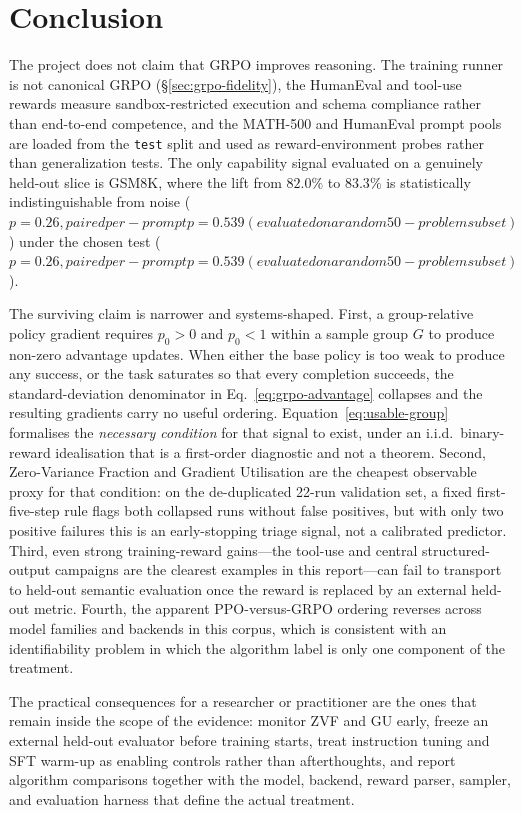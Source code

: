 \documentclass[12pt,a4paper]{report}
\begin{document}
\section{Conclusion}
The project does not claim that GRPO improves reasoning. The training runner is not canonical GRPO (§\ref{sec:grpo-fidelity}), the HumanEval and tool-use rewards measure sandbox-restricted execution and schema compliance rather than end-to-end competence, and the MATH-500 and HumanEval prompt pools are loaded from the \texttt{test} split and used as reward-environment probes rather than generalization tests. The only capability signal evaluated on a genuinely held-out slice is GSM8K, where the lift from $82.0\%$ to $83.3\%$ is statistically indistinguishable from noise ($p=0.26, paired per-prompt p=0.539 (evaluated on a random 50-problem subset)$) under the chosen test ($p=0.26, paired per-prompt p=0.539 (evaluated on a random 50-problem subset)$).

The surviving claim is narrower and systems-shaped. First, a group-relative policy gradient requires $p_0 > 0$ and $p_0 < 1$ within a sample group $G$ to produce non-zero advantage updates. When either the base policy is too weak to produce any success, or the task saturates so that every completion succeeds, the standard-deviation denominator in Eq.~\eqref{eq:grpo-advantage} collapses and the resulting gradients carry no useful ordering. Equation~\eqref{eq:usable-group} formalises the \emph{necessary condition} for that signal to exist, under an i.i.d.\ binary-reward idealisation that is a first-order diagnostic and not a theorem. Second, Zero-Variance Fraction and Gradient Utilisation are the cheapest observable proxy for that condition: on the de-duplicated 22-run validation set, a fixed first-five-step rule flags both collapsed runs without false positives, but with only two positive failures this is an early-stopping triage signal, not a calibrated predictor. Third, even strong training-reward gains---the tool-use and central structured-output campaigns are the clearest examples in this report---can fail to transport to held-out semantic evaluation once the reward is replaced by an external held-out metric. Fourth, the apparent PPO-versus-GRPO ordering reverses across model families and backends in this corpus, which is consistent with an identifiability problem in which the algorithm label is only one component of the treatment.

The practical consequences for a researcher or practitioner are the ones that remain inside the scope of the evidence: monitor ZVF and GU early, freeze an external held-out evaluator before training starts, treat instruction tuning and SFT warm-up as enabling controls rather than afterthoughts, and report algorithm comparisons together with the model, backend, reward parser, sampler, and evaluation harness that define the actual treatment.
\end{document}
